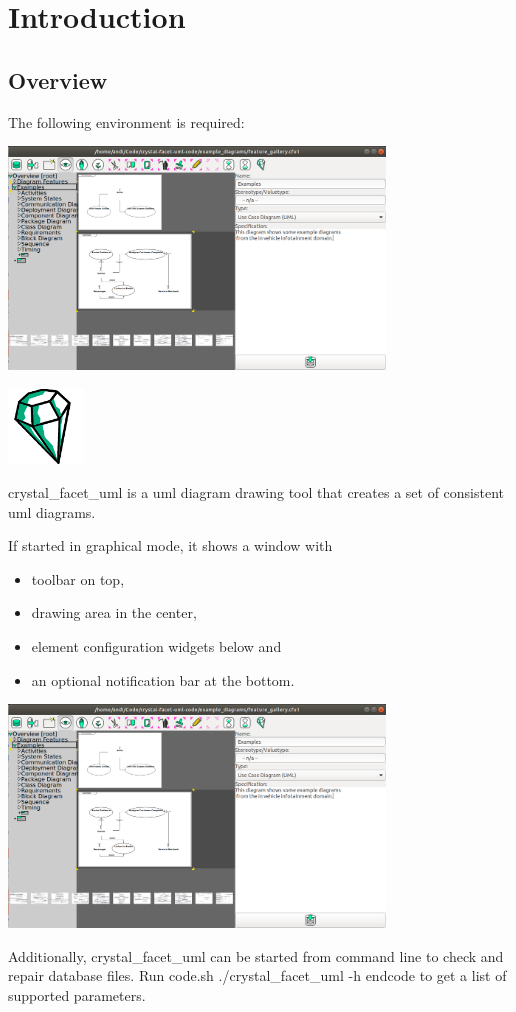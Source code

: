 \chapter{Introduction}
\label{introduction}

\section{Overview}

The following environment is required:

\includegraphics[width=10cm]{screenshot_1.png}



\includegraphics[width=2cm]{../../gui/source/resources/crystal_facet_uml}


crystal\_facet\_uml is a uml diagram drawing tool
that creates a set of consistent uml diagrams.

If started in graphical mode, it shows a window with
\begin{itemize}
\item toolbar on top,
\item drawing area in the center,
\item element configuration widgets below and
\item an optional notification bar at the bottom.
\end{itemize}

\includegraphics[width=10cm]{screenshot_1.png}

Additionally, crystal\_facet\_uml can be started from command line
to check and repair database files.
Run
code{.sh}
./crystal\_facet\_uml -h
endcode
to get a list of supported parameters.

